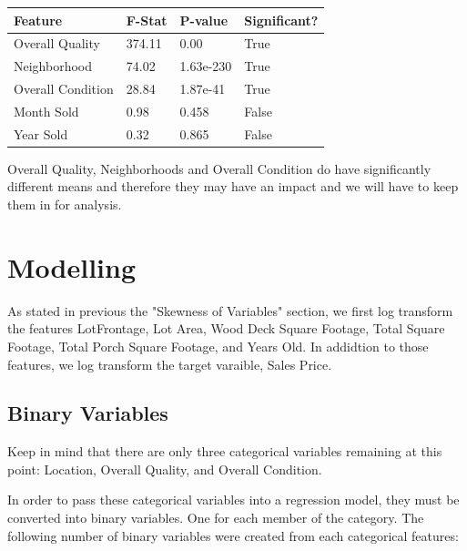 \documentclass{article}
\begin{document}
	\begin{table}[]
		\centering
		\begin{tabular}{llll}
		\hline
		\multicolumn{1}{|l|}{Feature} & \multicolumn{1}{l|}{F-Stat} & \multicolumn{1}{l|}{P-value} & \multicolumn{1}{l|}{Significant?} \\ \hline
		Overall Quality               & 374.11                      & 0.00                         & True                              \\
		Neighborhood                  & 74.02                       & 1.63e-230                    & True                              \\
		Overall Condition             & 28.84                       & 1.87e-41                     & True                              \\
		Month Sold                    & 0.98                        & 0.458                        & False                             \\
		Year Sold                     & 0.32                        & 0.865                        & False                            
		\end{tabular}
		\end{table}
	

	Overall Quality, Neighborhoods and Overall Condition do have significantly different means and therefore they may have an impact and we will have to keep them in for analysis.

	\section{Modelling}

	
	As stated in previous the "Skewness of Variables" section, we first log transform the features LotFrontage, Lot Area, Wood Deck Square Footage, Total Square Footage, Total Porch Square Footage, and Years Old. In addidtion to those features, we log transform the target varaible, Sales Price.

	\subsection{Binary Variables}

	Keep in mind that there are only three categorical variables remaining at this point: Location, Overall Quality, and Overall Condition.

	In order to pass these categorical variables into a regression model, they must be converted into binary variables. One for each member of the category. The following number of binary variables were created from each categorical features:
\end{document}
